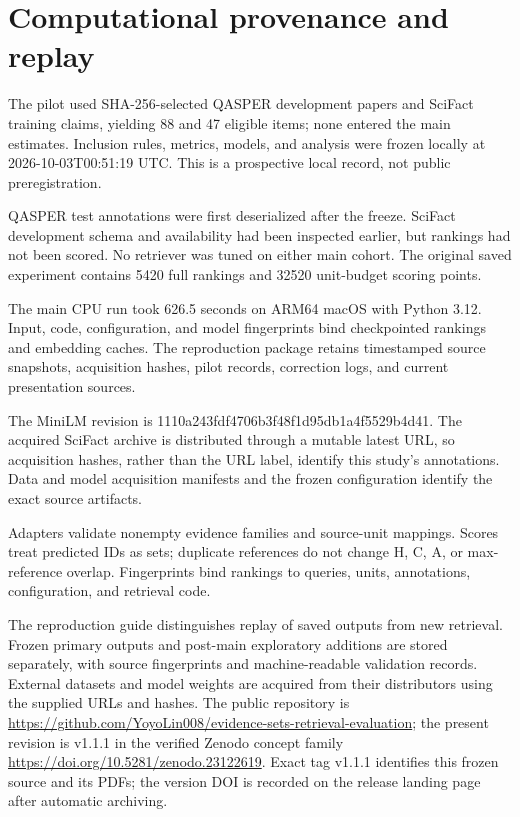 \documentclass[twoside,a4paper,11pt]{article}
\begin{document}
\section{Computational provenance and replay}
The pilot used SHA-256-selected QASPER development papers and SciFact training claims, yielding 88 and 47 eligible items; none entered the main estimates. Inclusion rules, metrics, models, and analysis were frozen locally at 2026-10-03T00:51:19 UTC. This is a prospective local record, not public preregistration.

QASPER test annotations were first deserialized after the freeze. SciFact development schema and availability had been inspected earlier, but rankings had not been scored. No retriever was tuned on either main cohort. The original saved experiment contains 5420 full rankings and 32520 unit-budget scoring points.

The main CPU run took 626.5 seconds on ARM64 macOS with Python 3.12. Input, code, configuration, and model fingerprints bind checkpointed rankings and embedding caches. The reproduction package retains timestamped source snapshots, acquisition hashes, pilot records, correction logs, and current presentation sources.

The MiniLM revision is 1110a243fdf4706b3f48f1d95db1a4f5529b4d41. The acquired SciFact archive is distributed through a mutable latest URL, so acquisition hashes, rather than the URL label, identify this study's annotations. Data and model acquisition manifests and the frozen configuration identify the exact source artifacts.

Adapters validate nonempty evidence families and source-unit mappings. Scores treat predicted IDs as sets; duplicate references do not change H, C, A, or max-reference overlap. Fingerprints bind rankings to queries, units, annotations, configuration, and retrieval code.

The reproduction guide distinguishes replay of saved outputs from new retrieval. Frozen primary outputs and post-main exploratory additions are stored separately, with source fingerprints and machine-readable validation records. External datasets and model weights are acquired from their distributors using the supplied URLs and hashes. The public repository is \url{https://github.com/YoyoLin008/evidence-sets-retrieval-evaluation}; the present revision is v1.1.1 in the verified Zenodo concept family \url{https://doi.org/10.5281/zenodo.23122619}. Exact tag v1.1.1 identifies this frozen source and its PDFs; the version DOI is recorded on the release landing page after automatic archiving.
\end{document}
